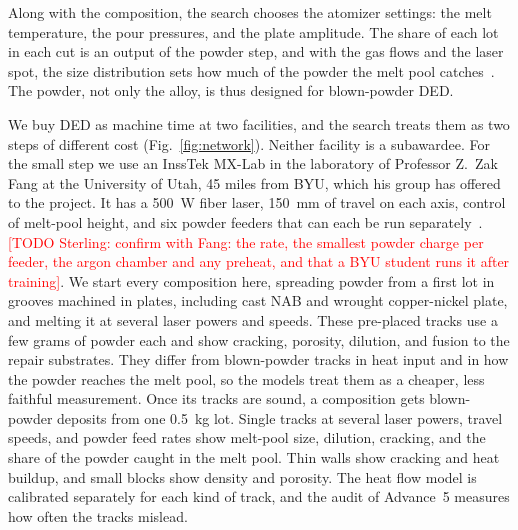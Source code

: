 \documentclass[12pt,letterpaper]{article}
\newcommand{\todo}[1]{\textcolor{red}{[TODO Sterling: #1]}}
\begin{document}
Along with the composition, the search chooses the atomizer settings: the
melt temperature, the pour pressures, and the plate amplitude. The share of
each lot in each cut is an output of the powder step, and with the gas flows
and the laser spot, the size distribution sets how much of the powder the
melt pool catches~\cite{ancalmo2025}. The powder, not only the alloy, is thus
designed for blown-powder DED.

We buy DED as machine time at two facilities, and the search treats them as
two steps of different cost (Fig.~\ref{fig:network}). Neither facility is a
subawardee. For the small step we use an InssTek MX-Lab in the laboratory
of Professor Z.~Zak Fang at the University of Utah, 45 miles from BYU, which
his group has offered to the project. It has a 500~W fiber laser, 150~mm of
travel on each axis, control of melt-pool height, and six powder feeders that
can each be run separately~\cite{insstek,utahded}. \todo{confirm with Fang: the rate, the
smallest powder charge per feeder, the argon chamber and any preheat, and
that a BYU student runs it after training}. We start every composition
here, spreading powder from a first lot in grooves machined in plates,
including cast NAB and wrought copper-nickel plate, and melting it at several
laser powers and speeds. These pre-placed tracks use a few grams of powder each and show
cracking, porosity, dilution, and fusion to the repair substrates. They
differ from blown-powder tracks in heat input and in how the powder reaches
the melt pool, so the models treat them as a cheaper, less faithful
measurement. Once its tracks are sound, a composition gets blown-powder
deposits from one 0.5~kg lot. Single tracks at several laser powers, travel
speeds, and powder feed rates show melt-pool size, dilution, cracking, and
the share of the powder caught in the melt pool. Thin walls show cracking
and heat buildup, and small blocks show density and porosity. The heat flow model is
calibrated separately for each kind of track, and the audit of Advance~5
measures how often the tracks mislead.
\end{document}
